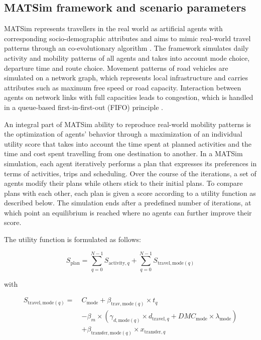 \documentclass[preprint,12pt,authoryear]{elsarticle}
\newif\ifshowtodooverview
\DeclareRobustCommand{\todobacklink}{%
  \ifshowtodooverview\quad{\scriptsize\hyperlink{todo-overview}{[\,$\uparrow$ Overview\,]}}\fi
}
\newcommand{\yanetsi}[1]{\todo[inline, color=purple!40]{\textbf{Yanetsi:} #1\todobacklink}}
\newcommand{\absatz}{\par\hspace*{1.5em}\ignorespaces}
\begin{document}
\hypertarget{todo:method-yanetsi-drt-mod}{}\subsection*{MATSim framework and scenario parameters}
\yanetsi{Explain more of how DRT is modelled?}
MATSim represents travellers in the real world as artificial agents with corresponding socio-demographic attributes and aims to mimic real-world travel patterns through an co-evolutionary algorithm \citep{nnene2023simulation}.
The framework simulates daily activity and mobility patterns of all agents and takes into account mode choice, departure time and route choice.
Movement patterns of road vehicles are simulated on a network graph, which represents local infrastructure and carries attributes such as maximum free speed or road capacity.
Interaction between agents on network links with full capacities leads to congestion, which is handled in a queue-based first-in-first-out (FIFO) principle \citep{Horni.2016}.
\absatz
An integral part of MATSim ability to reproduce real-world mobility patterns is the optimization of agents' behavior through a maximization of an individual utility score that takes into account the time spent at planned activities and the time and cost spent travelling from one destination to another.
In a MATSim simulation, each agent iteratively performs a plan that expresses its preferences in terms of activities, trips and scheduling.
Over the course of the iterations, a set of agents modify their plans while others stick to their initial plans.
To compare plans with each other, each plan is given a score according to a utility function as described below.
The simulation ends after a predefined number of iterations, at which point an equilibrium is reached where no agents can further improve their score.
\absatz
The utility function is formulated as follows:

\begin{equation}
S_{\text{plan}} = \sum_{q=0}^{N-1} S_{\text{activity},q} + \sum_{q=0}^{N-1} S_{\text{travel},\text{mode}(q)}
\label{1}
\end{equation}

with

\begin{equation}
\begin{aligned}
S_{\text{travel},\text{mode}(q)} =\ & C_{\text{mode}} + \beta_{\text{trav},\text{mode}(q)} \times t_{q} \\
& - \beta_{m} \times \left( \gamma_{d,\text{mode}(q)} \times d_{\text{travel},q} + DMC_{\text{mode}} \times \lambda_{\text{mode}} \right) \\
& + \beta_{\text{transfer},\text{mode}(q)} \times x_{\text{transfer},q}
\end{aligned}
\end{equation}
\end{document}
